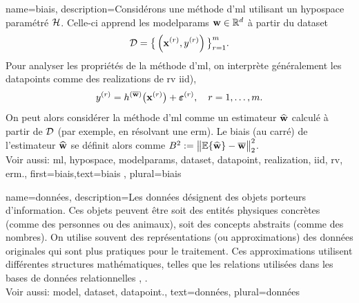 {
	name={biais},
	description={Considérons une méthode d'\gls{ml} utilisant un \gls{hypospace} paramétré $\mathcal{H}$. 
		Celle-ci apprend les \gls{modelparams} ${\bf w} \in \mathbb{R}^{d}$ à partir du \gls{dataset} 
		$$ \mathcal{D}=\big\{ \left( {\bf x}^{(r)},y^{(r)} \right) \big\}_{r=1}^{m}.$$ 
		Pour analyser les propriétés de la méthode d'\gls{ml}, on interprète généralement les \glspl{datapoint} comme des \glspl{realization} de
		\gls{rv} \gls{iid}), 
		$$ y^{(r)} = h^{(\overline{{\bf w}})}\big( {\bf x}^{(r)} \big) + \bm{\varepsilon}^{(r)}, \quad r=1,\ldots,m.$$ 
		On peut alors considérer la méthode d'\gls{ml} comme un estimateur $\widehat{{\bf w}}$ 
		calculé à partir de $\mathcal{D}$ (par exemple, en résolvant une \gls{erm}). Le biais (au carré) de l’estimateur $\widehat{{\bf w}}$ 
		se définit alors comme $B^{2} := \big\| \mathbb{E} \{ \widehat{{\bf w}}  \}- \overline{{\bf w}}\big\|_{2}^{2}$.
		\\ 
		Voir aussi: \gls{ml}, \gls{hypospace}, \gls{modelparams}, \gls{dataset}, \gls{datapoint}, \gls{realization}, \gls{iid}, \gls{rv}, \gls{erm}.},
	first={biais},text={biais} , plural={biais}
}

{name={données},
	description={Les données désignent des objets porteurs d'information. Ces 
		objets peuvent être soit des entités physiques concrètes (comme des personnes ou des animaux), 
		soit des concepts abstraits (comme des nombres). On utilise souvent des représentations (ou 
		approximations) des données originales qui sont plus pratiques pour le traitement. 
		Ces approximations utilisent différentes structures mathématiques, telles que les relations 
		utilisées dans les bases de données relationnelles \cite{codd1970relational}, \cite{silberschatz2019database}.
		\\
		Voir aussi: \gls{model}, \gls{dataset}, \gls{datapoint}.}, 
	text={données}, plural={données}
}


